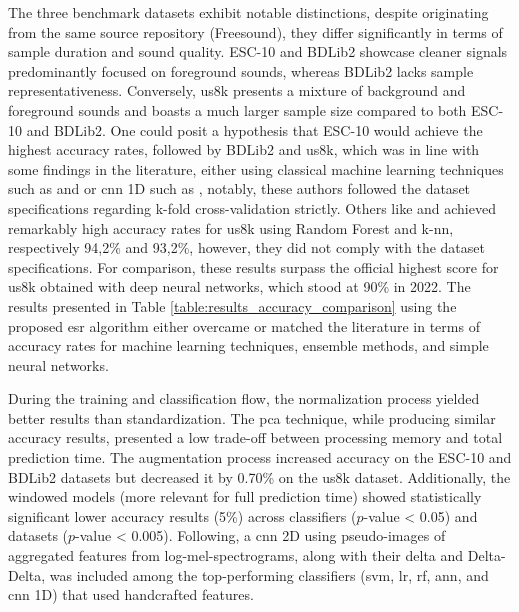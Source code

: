 The three benchmark datasets exhibit notable distinctions, despite originating from the same source repository (Freesound), they differ significantly in terms of sample duration and sound quality. ESC-10 and BDLib2 showcase cleaner signals predominantly focused on foreground sounds, whereas BDLib2 lacks sample representativeness. Conversely, \gls{us8k} presents a mixture of background and foreground sounds and boasts a much larger sample size compared to both ESC-10 and BDLib2. One could posit a hypothesis that ESC-10 would achieve the highest accuracy rates, followed by BDLib2 and \gls{us8k}, which was in line with some findings in the literature, either using classical machine learning techniques such as \textcite{Silva2019} and \textcite{Bountourakis2019} or \gls{cnn} 1D such as \textcite{Vandendriessche2021}, notably, these authors followed the dataset specifications regarding k-fold cross-validation strictly. Others like \textcite{Lhoest2021} and \textcite{Luz2021} achieved remarkably high accuracy rates for \gls{us8k} using Random Forest and \gls{k-nn}, respectively 94,2\% and 93,2\%, however, they did not comply with the dataset specifications. For comparison, these results surpass the official highest score for \gls{us8k} obtained with deep neural networks, which stood at 90\% in 2022. The results presented in Table \ref{table:results_accuracy_comparison} using the proposed \gls{esr} algorithm either overcame or matched the literature in terms of accuracy rates for machine learning techniques, ensemble methods, and simple neural networks.


During the training and classification flow, the normalization process yielded better results than standardization. The \gls{pca} technique, while producing similar accuracy results, presented a low trade-off between processing memory and total prediction time. The augmentation process increased accuracy on the ESC-10 and BDLib2 datasets but decreased it by 0.70\% on the \gls{us8k} dataset. Additionally, the windowed models (more relevant for full prediction time) showed statistically significant lower accuracy results (5\%) across classifiers ($p$-value < 0.05) and datasets ($p$-value < 0.005). Following, a \gls{cnn} 2D using pseudo-images of aggregated features from log-mel-spectrograms, along with their delta and Delta-Delta, was included among the top-performing classifiers (\gls{svm}, \gls{lr}, \gls{rf}, \gls{ann}, and \gls{cnn} 1D) that used handcrafted features.

